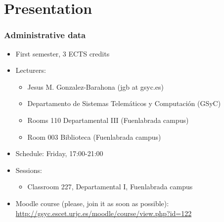 
\section{Presentation}


\begin{frame}
\frametitle{Administrative data}

\begin{itemize}
\item First semester, 3 ECTS credits
\item Lecturers:
  \begin{itemize}
  \item Jesus M. Gonzalez-Barahona (jgb at gsyc.es)
  \item Departamento de Sistemas Telemáticos y Computación (GSyC)
  \item Rooms 110 Departamental III (Fuenlabrada campus)
  \item Room 003 Biblioteca (Fuenlabrada campus)
  \end{itemize}
\item Schedule: Friday, 17:00-21:00
\item Sessions:
  \begin{itemize}
  \item Classroom 227, Departamental I, Fuenlabrada campus
  \end{itemize}
\item Moodle course (please, join it as soon as possible): \\
  {\footnotesize \url{http://gsyc.escet.urjc.es/moodle/course/view.php?id=122}}
\end{itemize}
\end{frame}


